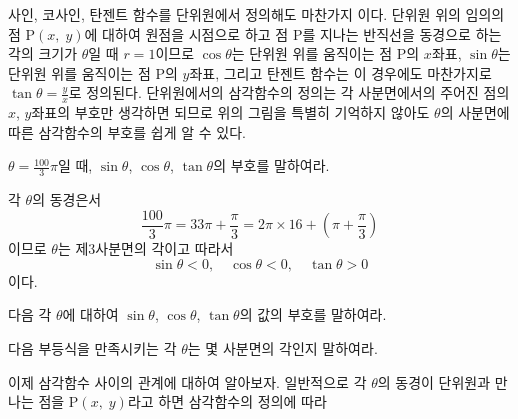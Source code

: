 \documentclass[11pt, a4paper]{book}
\begin{document}
  사인, 코사인, 탄젠트 함수를 단위원에서 정의해도 마찬가지 이다. 단위원 위의 임의의 점 $\textrm{P}(x, \;y)$에 대하여 원점을 시점으로 하고 점 \textrm{P}를 지나는 반직선을 동경으로 하는 각의 크기가 $\theta$일 때 $r=1$이므로 $\cos \theta$는 단위원 위를 움직이는 점 \textrm{P}의 $x$좌표, $\sin \theta$는 단위원 위를 움직이는 점 \textrm{P}의 $y$좌표, 그리고 탄젠트 함수는 이 경우에도 마찬가지로 $\tan \theta =\frac{y}{x}$로 정의된다.  단위원에서의 삼각함수의 정의는 각 사분면에서의 주어진 점의 $x$, $y$좌표의 부호만 생각하면 되므로 위의 그림을 특별히 기억하지 않아도 $\theta$의 사분면에 따른 삼각함수의 부호를 쉽게 알 수 있다.
  
  \begin{example}
  	$\theta =\frac{100}{3}\pi$일 때, $\sin\theta$, $\cos\theta$, $\tan\theta$의 부호를 말하여라.
  	\begin{solution}
  		각 $\theta$의 동경은서
  		\[
  		\frac{100}{3}\pi = 33 \pi +\frac{\pi}{3} = 2\pi \times 16 + \left(\pi+\frac{\pi}{3}\right)
  		\]
  		이므로 $\theta$는 제$3$사분면의 각이고 따라서
  		\[
  		\sin\theta<0, \quad \cos\theta<0, \quad \tan\theta>0
  		\]
  		이다.
  	\end{solution}
  \end{example}

\begin{problem}
	다음 각 $\theta$에 대하여 $\sin\theta$, $\cos\theta$, $\tan\theta$의 값의 부호를 말하여라.
\end{problem}
\vspace{1em}
\begin{problem}
	다음 부등식을 만족시키는 각 $\theta$는 몇 사분면의 각인지 말하여라.
\end{problem}

이제 삼각함수 사이의 관계에 대하여 알아보자. 일반적으로 각 $\theta$의 동경이 단위원과 만나는 점을 $\textrm{P}(x,\;y)$라고 하면 삼각함수의 정의에 따라
\end{document}
